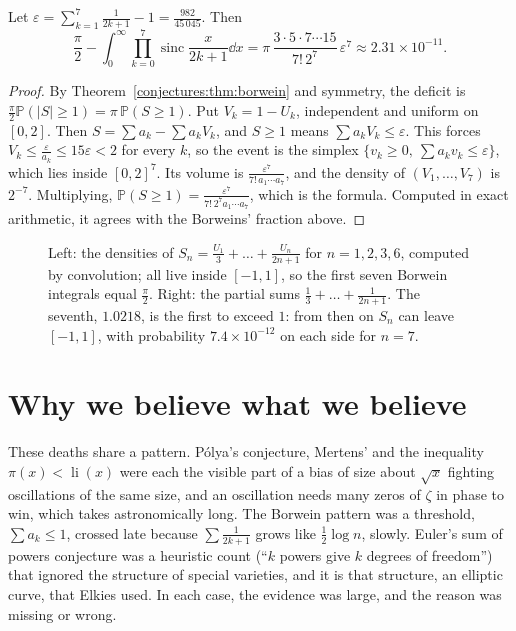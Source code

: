 \begin{corollary}\label{conjectures:cor:borweindeficit}
Let $\varepsilon=\sum_{k=1}^7\frac1{2k+1}-1=\frac{982}{45\,045}$. Then
\[
\frac\pi2-\int_0^\infty\prod_{k=0}^7\operatorname{sinc}\frac x{2k+1}\dd x=\pi\,\frac{3\cdot5\cdot7\cdots15}{7!\,2^7}\,\varepsilon^7\approx2.31\times10^{-11}.
\]
\end{corollary}
\begin{proof}
By Theorem~\ref{conjectures:thm:borwein} and symmetry, the deficit is $\frac\pi2\mathbb P(|S|\ge1)=\pi\,\mathbb P(S\ge1)$. Put $V_k=1-U_k$, independent and uniform on $[0,2]$. Then
$S=\sum a_k-\sum a_kV_k$, and $S\ge1$ means $\sum a_kV_k\le\varepsilon$. This forces $V_k\le\frac\varepsilon{a_k}\le15\varepsilon<2$ for every $k$, so the event is
the simplex $\{v_k\ge0,\ \sum a_kv_k\le\varepsilon\}$, which lies inside $[0,2]^7$. Its volume is $\frac{\varepsilon^7}{7!\,a_1\cdots a_7}$, and the density of
$(V_1,\dots,V_7)$ is $2^{-7}$. Multiplying, $\mathbb P(S\ge1)=\frac{\varepsilon^7}{7!\,2^7a_1\cdots a_7}$, which is the formula. Computed in exact arithmetic, it
agrees with the Borweins' fraction above.
\end{proof}

\begin{figure}[ht]
\centering
{}
\caption{Left: the densities of $S_n=\frac{U_1}3+\dots+\frac{U_n}{2n+1}$ for $n=1,2,3,6$, computed by convolution; all live inside $[-1,1]$, so the first seven
Borwein integrals equal $\frac\pi2$. Right: the partial sums $\frac13+\dots+\frac1{2n+1}$. The seventh, $1.0218$, is the first to exceed $1$: from then on $S_n$
can leave $[-1,1]$, with probability $7.4\times10^{-12}$ on each side for $n=7$.}
\label{conjectures:fig:borwein}
\end{figure}

\section{Why we believe what we believe}

These deaths share a pattern. P\'olya's conjecture, Mertens' and the inequality $\pi(x)<\operatorname{li}(x)$ were each the visible part of a bias of size about
$\sqrt x$ fighting oscillations of the same size, and an oscillation needs many zeros of $\zeta$ in phase to win, which takes astronomically long. The Borwein
pattern was a threshold, $\sum a_k\le1$, crossed late because $\sum\frac1{2k+1}$ grows like $\frac12\log n$, slowly. Euler's sum of powers conjecture was a
heuristic count (``$k$ powers give $k$ degrees of freedom'') that ignored the structure of special varieties, and it is that structure, an elliptic curve, that
Elkies used. In each case, the evidence was large, and the reason was missing or wrong.

